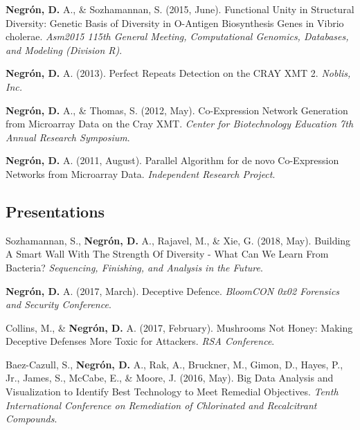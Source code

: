 \documentclass[11pt,a4paper,]{awesome-cv}
\begin{document}
\leavevmode{}%
\textbf{Negrón, D.} A., \& Sozhamannan, S. (2015, June). Functional
Unity in Structural Diversity: Genetic Basis of Diversity in O-Antigen
Biosynthesis Genes in Vibrio cholerae. \emph{Asm2015 115th General
Meeting, Computational Genomics, Databases, and Modeling (Division R)}.

\leavevmode{}%
\textbf{Negrón, D.} A. (2013). Perfect Repeats Detection on the CRAY XMT
2. \emph{Noblis, Inc.}

\leavevmode{}%
\textbf{Negrón, D.} A., \& Thomas, S. (2012, May). Co-Expression Network
Generation from Microarray Data on the Cray XMT. \emph{Center for
Biotechnology Education 7th Annual Research Symposium}.

\leavevmode{}%
\textbf{Negrón, D.} A. (2011, August). Parallel Algorithm for de novo
Co-Expression Networks from Microarray Data. \emph{Independent Research
Project}.

\hypertarget{presentations}{%
\subsection{Presentations}\label{presentations}}

\hypertarget{bibliography}{}
\leavevmode{}%
Sozhamannan, S., \textbf{Negrón, D.} A., Rajavel, M., \& Xie, G. (2018,
May). Building A Smart Wall With The Strength Of Diversity - What Can We
Learn From Bacteria? \emph{Sequencing, Finishing, and Analysis in the
Future}.

\leavevmode{}%
\textbf{Negrón, D.} A. (2017, March). Deceptive Defence. \emph{BloomCON
0x02 Forensics and Security Conference}.

\leavevmode{}%
Collins, M., \& \textbf{Negrón, D.} A. (2017, February). Mushrooms Not
Honey: Making Deceptive Defenses More Toxic for Attackers. \emph{RSA
Conference}.

\leavevmode{}%
Baez-Cazull, S., \textbf{Negrón, D.} A., Rak, A., Bruckner, M., Gimon,
D., Hayes, P., Jr., James, S., McCabe, E., \& Moore, J. (2016, May). Big
Data Analysis and Visualization to Identify Best Technology to Meet
Remedial Objectives. \emph{Tenth International Conference on Remediation
of Chlorinated and Recalcitrant Compounds}.
\end{document}
